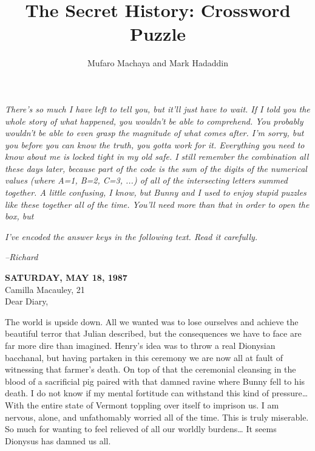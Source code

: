 \documentclass{article}
\title{The Secret History: Crossword Puzzle}
\author{Mufaro Machaya and Mark Hadaddin}
\begin{document}
\maketitle

\textit{There's so much I have left to tell you, but it'll just have to wait. If I told you the whole story of what
happened, you wouldn't be able to comprehend. You probably wouldn't be able to even grasp the magnitude of what comes
after. I'm sorry, but you before you can know the truth, you gotta work for it. Everything you need to know about
me is locked tight in my old safe. I still remember the combination all these days later, because part of the code is
the sum of the digits of the numerical values (where A=1, B=2, C=3, ...) of all of the intersecting letters summed
together. A little confusing, I know, but Bunny and I used to enjoy stupid puzzles like these together all of the time.
You'll need more than that in order to open the box, but}

\textit{I've encoded the answer keys in the following text. Read it carefully.} \begin{flushright}
  {\textit{--Richard}} \\
\end{flushright}

\noindent
\textbf{SATURDAY, MAY 18, 1987} \\

\noindent
Camilla Macauley, 21 \\

\noindent
Dear Diary,

The world is upside down. All we wanted was to lose ourselves and achieve the beautiful terror that Julian described, but the consequences we have to face are far more dire than imagined. Henry’s idea was to throw a real Dionysian bacchanal, but having partaken in this ceremony we are now all at fault of witnessing that farmer’s death. On top of that the ceremonial cleansing in the blood of a sacrificial pig paired with that damned ravine where Bunny fell to his death. I do not know if my mental fortitude can withstand this kind of pressure… With the entire state of Vermont toppling over itself to imprison us. I am nervous, alone, and unfathomably worried all of the time. This is truly miserable. So much for wanting to feel relieved of all our worldly burdens… It seems Dionysus has damned us all.

\newpage
\end{document}
